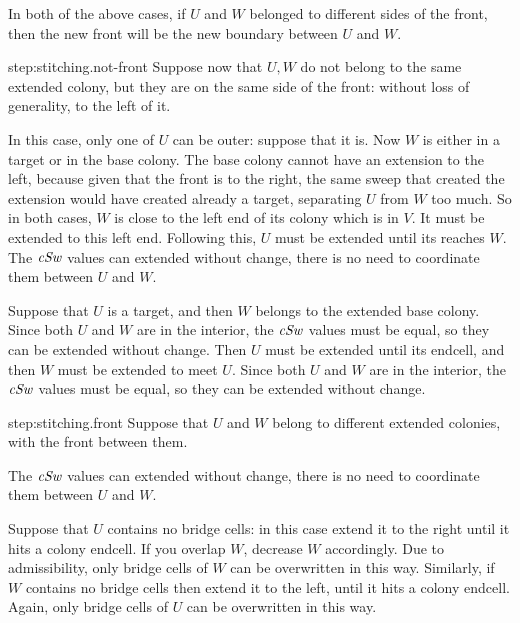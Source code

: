 \documentclass[12pt]{memoir}
\newcommand{\fld}[1]{\ensuremath{\textit{#1\/}}}
\newcommand{\cSweep}{\fld{cSw}}
\begin{document}
\begin{Proof}
\begin{prooof}
In both of the above cases, if \( U  \) and \( W \) belonged to different sides of the front, then the
new front will be the new boundary between \( U \) and \( W \).
\end{prooof} %

\begin{step+}{step:stitching.not-front}
Suppose now that \( U,W \) do not belong to the same extended colony, but they are on 
the same side of the front: without loss of generality, to the left of it.
\end{step+}
\begin{prooof}
In this case, only one of \( U \) can be outer: suppose that it is.
Now \( W \) is either in a target or in the base colony.
The base colony cannot have an extension to the left, because given that the front
is to the right, the same sweep that created the extension would have created already a target, 
separating \( U \) from \( W \) too much.
So in both cases, \( W \) is close to the left end of its colony which is in \( V \).
It must be extended to this left end.
Following this, \( U \) must be extended until its reaches \( W \).
The \( \cSweep \) values can extended without change, there is no need to coordinate them
between \( U \) and \( W \).

Suppose that \( U \) is a target, and then \( W \) belongs to the extended base colony.
Since both \( U \) and \( W \) are in the interior, the \( \cSweep \) values must be equal, so they
can be extended without change.
Then \( U \) must be extended until its endcell, and then \( W \) must be extended to meet \( U \).
Since both \( U \) and \( W \) are in the interior, the \( \cSweep \) values must be equal, so they
can be extended without change.
\end{prooof} %

\begin{step+}{step:stitching.front}
Suppose that \( U \) and \( W \) belong to different extended colonies, with the front between them.
\end{step+}
\begin{prooof}
The \( \cSweep \) values can extended without change, there is no need to coordinate them
between \( U \) and \( W \).

Suppose that \( U \) contains no bridge cells: in this case extend it to the right until it hits
a colony endcell.
If you overlap \( W \), decrease \( W \) accordingly.
Due to admissibility, only bridge cells of \( W \) can be overwritten in this way.
Similarly, if \( W \) contains no bridge cells then extend it to the left, until it hits a colony endcell.
Again, only bridge cells of \( U \) can be overwritten in this way.


\end{prooof}
\end{Proof}
\end{document}
